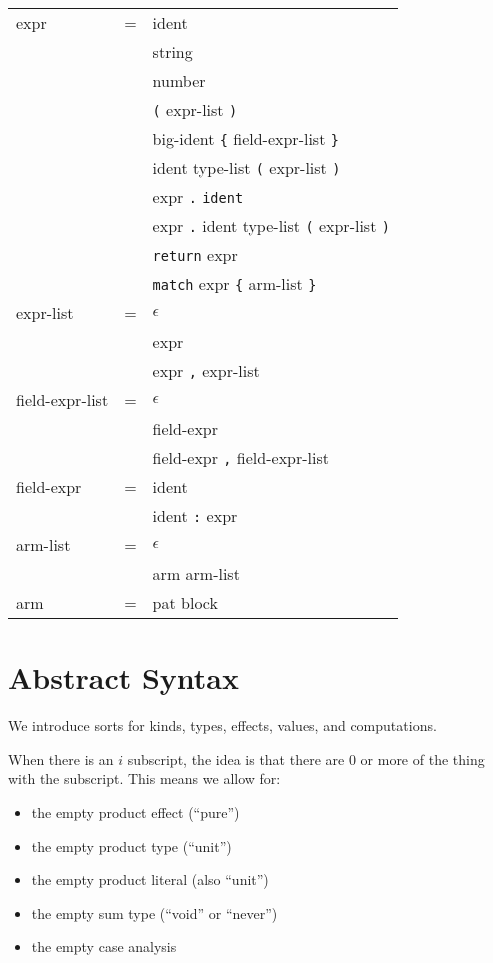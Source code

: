 \documentclass[12pt]{article}
\newcommand{\E}[0]{$\epsilon$}
\newcommand{\T}[1]{\texttt{#1}}
\newcommand{\N}[1]{\textlangle#1\textrangle}
\begin{document}
\begin{tabular}{lll}
\N{expr} & =
  & \N{ident} \\
& & \N{string} \\
& & \N{number} \\
& & \T{(} \N{expr-list} \T{)} \\
& & \N{big-ident} \T{\{} \N{field-expr-list} \T{\}} \\
& & \N{ident} \N{type-list} \T{(} \N{expr-list} \T{)} \\
& & \N{expr} \T{.} \T{ident} \\
& & \N{expr} \T{.} \N{ident} \N{type-list} \T{(} \N{expr-list} \T{)} \\
& & \T{return} \N{expr} \\
& & \T{match} \N{expr} \T{\{} \N{arm-list} \T{\}} \\
\N{expr-list} & =
  & \E \\
& & \N{expr} \\
& & \N{expr} \T{,} \N{expr-list} \\
\N{field-expr-list} & =
  & \E \\
& & \N{field-expr} \\
& & \N{field-expr} \T{,} \N{field-expr-list} \\
\N{field-expr} & =
  & \N{ident} \\
& & \N{ident} \T{:} \N{expr} \\
\N{arm-list} & =
  & \E \\
& & \N{arm} \N{arm-list} \\
\N{arm} & =
  & \N{pat} \N{block}
\end{tabular}

\newpage
\section{Abstract Syntax}

We introduce sorts for kinds, types, effects, values, and computations.

When there is an $i$ subscript, the idea is that there are 0 or more of the
thing with the subscript. This means we allow for:
\begin{itemize}
\item the empty product effect (``pure'')
\item the empty product type (``unit'')
\item the empty product literal (also ``unit'')
\item the empty sum type (``void'' or ``never'')
\item the empty case analysis
\end{itemize}
\end{document}
